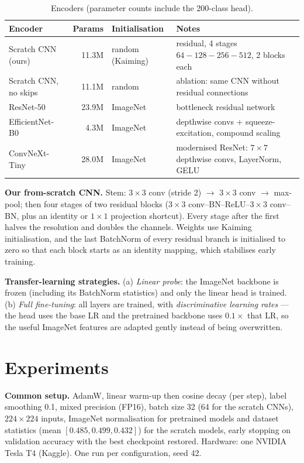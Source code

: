 \documentclass[11pt,a4paper]{article}
\begin{document}
\begin{table}[H]\centering\small
\begin{tabular}{lrll}
\toprule
Encoder & Params & Initialisation & Notes\\
\midrule
Scratch CNN (ours) & 11.3M & random (Kaiming) & residual, 4 stages $64\!-\!128\!-\!256\!-\!512$, 2 blocks each\\
Scratch CNN, no skips & 11.1M & random & ablation: same CNN without residual connections\\
ResNet-50~\cite{resnet} & 23.9M & ImageNet & bottleneck residual network\\
EfficientNet-B0~\cite{effnet} & 4.3M & ImageNet & depthwise convs + squeeze-excitation, compound scaling\\
ConvNeXt-Tiny~\cite{convnext} & 28.0M & ImageNet & modernised ResNet: $7\times7$ depthwise convs, LayerNorm, GELU\\
\bottomrule
\end{tabular}
\caption{Encoders (parameter counts include the 200-class head).}
\end{table}

\textbf{Our from-scratch CNN.} Stem: $3\times3$ conv (stride 2) $\rightarrow$ $3\times3$ conv $\rightarrow$
max-pool; then four stages of two residual blocks ($3\times3$ conv--BN--ReLU--$3\times3$ conv--BN, plus an
identity or $1\times1$ projection shortcut). Every stage after the first halves the resolution and doubles the
channels. Weights use Kaiming initialisation, and the last BatchNorm of every residual branch is initialised
to zero so that each block starts as an identity mapping, which stabilises early training.

\textbf{Transfer-learning strategies.} (a) \emph{Linear probe}: the ImageNet backbone is frozen (including its
BatchNorm statistics) and only the linear head is trained. (b) \emph{Full fine-tuning}: all layers are trained,
with \emph{discriminative learning rates} --- the head uses the base LR and the pretrained backbone uses
$0.1\times$ that LR, so the useful ImageNet features are adapted gently instead of being overwritten.

\section{Experiments}
\textbf{Common setup.} AdamW, linear warm-up then cosine decay (per step), label smoothing 0.1, mixed precision
(FP16), batch size 32 (64 for the scratch CNNs), $224\times224$ inputs, ImageNet normalisation for pretrained
models and dataset statistics (mean $[0.485, 0.499, 0.432]$) for the scratch models, early stopping on
validation accuracy with the best checkpoint restored. Hardware: one NVIDIA Tesla T4 (Kaggle). One run per
configuration, seed 42.
\end{document}
